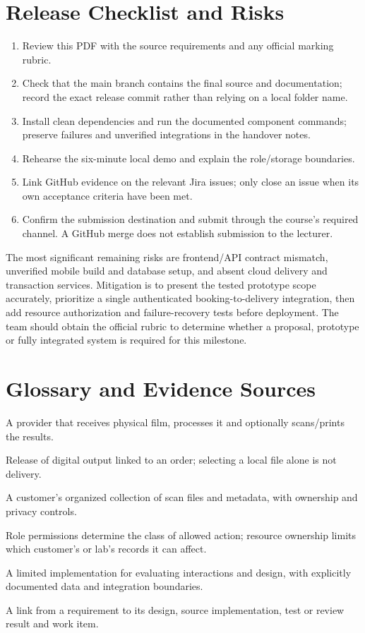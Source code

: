 \section{Release Checklist and Risks}
\begin{enumerate}
\item Review this PDF with the source requirements and any official marking rubric.
\item Check that the main branch contains the final source and documentation;
record the exact release commit rather than relying on a local folder name.
\item Install clean dependencies and run the documented component commands;
preserve failures and unverified integrations in the handover notes.
\item Rehearse the six-minute local demo and explain the role/storage boundaries.
\item Link GitHub evidence on the relevant Jira issues; only close an issue when
its own acceptance criteria have been met.
\item Confirm the submission destination and submit through the course's required
channel. A GitHub merge does not establish submission to the lecturer.
\end{enumerate}

The most significant remaining risks are frontend/API contract mismatch,
unverified mobile build and database setup, and absent cloud delivery and
transaction services. Mitigation is to present the tested prototype scope
accurately, prioritize a single authenticated booking-to-delivery integration,
then add resource authorization and failure-recovery tests before deployment.
The team should obtain the official rubric to determine whether a proposal,
prototype or fully integrated system is required for this milestone.

\section{Glossary and Evidence Sources}
\begin{description}[style=nextline]
\item[Film Lab] A provider that receives physical film, processes it and optionally
scans/prints the results.
\item[Scan delivery] Release of digital output linked to an order; selecting a local
file alone is not delivery.
\item[Digital Film Archive] A customer's organized collection of scan files and
metadata, with ownership and privacy controls.
\item[RBAC / ownership] Role permissions determine the class of allowed action;
resource ownership limits which customer's or lab's records it can affect.
\item[Prototype] A limited implementation for evaluating interactions and design,
with explicitly documented data and integration boundaries.
\item[Traceability] A link from a requirement to its design, source implementation,
test or review result and work item.
\end{description}

